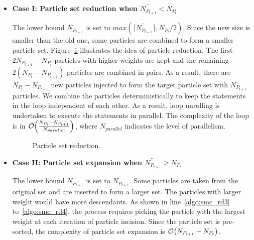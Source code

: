 \begin{itemize}
\item {\bf Case I: Particle set reduction when $\widetilde{N_{P_{t+1}}} < {N_{P_t}}$} 

The lower bound ${N_{P_{t+1}}}$ is set to $max\left(\lceil\widetilde{N_{P_{t+1}}}\rceil, {N_{P_t}}/2\right)$.
Since the new size is smaller than the old one, some particles are combined to form a smaller particle set.
Figure~\ref{fig:tuning} illustrates the idea of particle reduction.
The first $2{N_{P_{t+1}}}-{N_{P_t}}$ particles with higher weights are kept and the remaining $2({N_{P_t}}-{N_{P_{t+1}}})$ particles are combined in pairs.
As a result, there are ${N_{P_t}}-{N_{P_{t+1}}}$ new particles injected to form the target particle set with ${N_{P_{t+1}}}$ particles.
We combine the particles deterministically to keep the statements in the loop independent of each other.
As a result, loop unrolling is undertaken to execute the statements in parallel.
The complexity of the loop is in $\mathop{}\mathopen{}\mathcal{O}\mathopen{}\left(\frac{{N_{P_t}}-{N_{P_{t+1}}}}{N_{parallel}}\right)$, where $N_{parallel}$ indicates the level of parallelism.

\setcounter{subfigure}{0}
\begin{figure}[t!]
\centering
{}
\caption{Particle set reduction.}
\label{fig:tuning}
\end{figure}

\item {\bf Case II: Particle set expansion when $\widetilde{N_{P_{t+1}}} \geq {N_{P_t}}$}

The lower bound ${N_{P_{t+1}}}$ is set to $\widetilde{N_{P_{t+1}}}$.
Some particles are taken from the original set and are inserted to form a larger set.
The particles with larger weight would have more descendants.
As shown in line~\ref{algo:smc_rd3} to~\ref{algo:smc_rd4}, the process requires picking the particle with the largest weight at each iteration of particle incision.
Since the particle set is pre-sorted, the complexity of particle set expansion is $\mathop{}\mathopen{}\mathcal{O}\mathopen{}\left(N_{P_{t+1}}-{N_{P_t}}\right)$.

\end{itemize}

